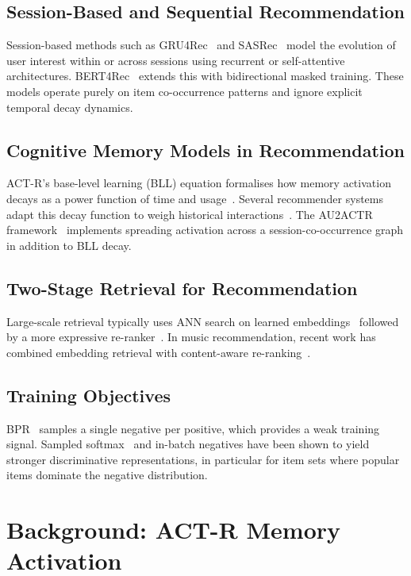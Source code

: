 \documentclass[conference]{IEEEtran}
\begin{document}
\subsection{Session-Based and Sequential Recommendation}
Session-based methods such as GRU4Rec~\cite{hidasi2015gru4rec}
and SASRec~\cite{kang2018sasrec} model the evolution of user
interest within or across sessions using recurrent or
self-attentive architectures.
BERT4Rec~\cite{sun2019bert4rec} extends this with bidirectional
masked training.
These models operate purely on item co-occurrence patterns and
ignore explicit temporal decay dynamics.

\subsection{Cognitive Memory Models in Recommendation}
ACT-R's base-level learning (BLL) equation formalises how
memory activation decays as a power function of time and
usage~\cite{anderson1983}.
Several recommender systems adapt this decay function to weigh
historical interactions~\cite{kowald2017forgetting,
khrabrov2010discovery}.
The AU2ACTR framework~\cite{au2actr} implements spreading
activation across a session-co-occurrence graph in addition
to BLL decay.

\subsection{Two-Stage Retrieval for Recommendation}
Large-scale retrieval typically uses ANN search on learned
embeddings~\cite{johnson2019faiss} followed by a more expressive
re-ranker~\cite{pei2019reranking}.
In music recommendation, recent work has combined embedding
retrieval with content-aware re-ranking~\cite{schedl2018}.

\subsection{Training Objectives}
BPR~\cite{rendle2009bpr} samples a single negative per positive,
which provides a weak training signal.
Sampled softmax~\cite{yi2019sampled} and in-batch negatives have
been shown to yield stronger discriminative representations, in
particular for item sets where popular items dominate the
negative distribution.

\section{Background: ACT-R Memory Activation}
\end{document}
